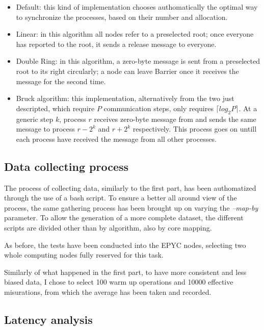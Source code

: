 \documentclass{article}
\begin{document}
	\begin{itemize}
		\item Default: this kind of implementation chooses authomatically the optimal way to synchronize the processes, based on their number and allocation.\\
		\item Linear: in this algorithm all nodes refer to a preselected root; once everyone has reported to the root, it sends a release message to everyone.\\
		\item Double Ring: in this algorithm, a zero-byte message is sent from a preselected root to its right circularly; a node can leave Barrier once it receives the message for the second time.\\
		\item Bruck algorithm: this implementation, alternatively from the two just descripted, which require $P$ communication steps, only requires $\lceil log_2P \rceil$. At a generic step $k$, process $r$ receives zero-byte message from and sends the same message to process $r - 2^k$ and $r + 2^k$ respectively. This process goes on untill each process have received the message from all other processes.
	\end{itemize}
	
	\subsection{Data collecting process}
	
	The process of collecting data, similarly to the first part, has been authomatized through the use of a bash script. To ensure a better all around view of the process, the same gathering process has been brought up on varying the \textit{--map-by} parameter. To allow the generation of a more complete dataset, the different scripts are divided other than by algorithm, also by core mapping.
	
	As before, the tests have been conducted into the EPYC nodes, selecting two whole computing nodes fully reserved for this task.
	
	Similarly of what happened in the first part, to have more consistent and less biased data, I chose to select 100 warm up operations and 10000 effective misurations, from which the average has been taken and recorded.
	
	\subsection{Latency analysis}
	
\end{document}
